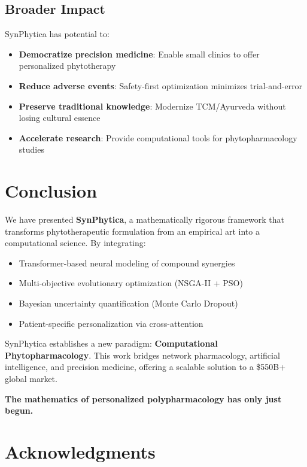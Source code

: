 \documentclass[12pt, a4paper]{article}
\begin{document}
\subsection{Broader Impact}

SynPhytica has potential to:
\begin{itemize}
    \item \textbf{Democratize precision medicine}: Enable small clinics to offer personalized phytotherapy
    \item \textbf{Reduce adverse events}: Safety-first optimization minimizes trial-and-error
    \item \textbf{Preserve traditional knowledge}: Modernize TCM/Ayurveda without losing cultural essence
    \item \textbf{Accelerate research}: Provide computational tools for phytopharmacology studies
\end{itemize}

\section{Conclusion}

We have presented \textbf{SynPhytica}, a mathematically rigorous framework that transforms phytotherapeutic formulation from an empirical art into a computational science. By integrating:

\begin{itemize}
    \item Transformer-based neural modeling of compound synergies
    \item Multi-objective evolutionary optimization (NSGA-II + PSO)
    \item Bayesian uncertainty quantification (Monte Carlo Dropout)
    \item Patient-specific personalization via cross-attention
\end{itemize}

SynPhytica establishes a new paradigm: \textbf{Computational Phytopharmacology}. This work bridges network pharmacology, artificial intelligence, and precision medicine, offering a scalable solution to a \$550B+ global market.

\textbf{The mathematics of personalized polypharmacology has only just begun.}

\section*{Acknowledgments}
\end{document}
